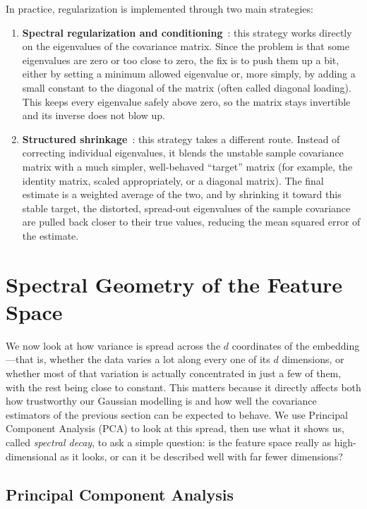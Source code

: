 In practice, regularization is implemented through two main strategies:

\begin{enumerate}
	\item \textbf{Spectral regularization and conditioning}~\cite{Friedman1989}: this strategy works directly on the eigenvalues of the covariance matrix. Since the problem is that some eigenvalues are zero or too close to zero, the fix is to push them up a bit, either by setting a minimum allowed eigenvalue or, more simply, by adding a small constant to the diagonal of the matrix (often called diagonal loading). This keeps every eigenvalue safely above zero, so the matrix stays invertible and its inverse does not blow up.

	\item \textbf{Structured shrinkage}~\cite{Ledoit2004,Chen2010}: this strategy takes a different route. Instead of correcting individual eigenvalues, it blends the unstable sample covariance matrix with a much simpler, well-behaved ``target'' matrix (for example, the identity matrix, scaled appropriately, or a diagonal matrix). The final estimate is a weighted average of the two, and by shrinking it toward this stable target, the distorted, spread-out eigenvalues of the sample covariance are pulled back closer to their true values, reducing the mean squared error of the estimate.
\end{enumerate}


\section{Spectral Geometry of the Feature Space}
\label{sec:gsc:spectral}

We now look at how variance is spread across the $d$ coordinates of the embedding---that is, whether the data varies a lot along every one of its $d$ dimensions, or whether most of that variation is actually concentrated in just a few of them, with the rest being close to constant. This matters because it directly affects both how trustworthy our Gaussian modelling is and how well the covariance estimators of the previous section can be expected to behave. We use Principal Component Analysis (PCA) to look at this spread, then use what it shows us, called \emph{spectral decay}, to ask a simple question: is the feature space really as high-dimensional as it looks, or can it be described well with far fewer dimensions?

\subsection{Principal Component Analysis}
\label{sec:marco:pca}

